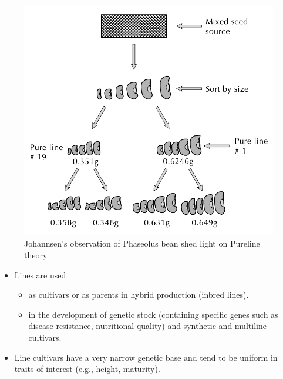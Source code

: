 \documentclass[11pt,dvipsnames,ignorenonframetext,aspectratio=169]{beamer}
\providecommand{\tightlist}{%
  \setlength{\itemsep}{0pt}\setlength{\parskip}{0pt}}
\begin{document}
\begin{frame}{}
\protect\hypertarget{section-7}{}
\begin{figure}

{\centering \includegraphics[width=0.45\linewidth]{../images/johannsens_purlines} 

}

\caption{Johannsen's observation of Phaseolus bean shed light on Pureline theory}\label{fig:johannsens-purelines}
\end{figure}
\end{frame}

\begin{frame}{}
\protect\hypertarget{section-8}{}
\begin{itemize}
\tightlist
\item
  Lines are used

  \begin{itemize}
  \tightlist
  \item
    as cultivars or as parents in hybrid production (inbred lines).
  \item
    in the development of genetic stock (containing specific genes such
    as disease resistance, nutritional quality) and synthetic and
    multiline cultivars.
  \end{itemize}
\item
  Line cultivars have a very narrow genetic base and tend to be uniform
  in traits of interest (e.g., height, maturity).
\end{itemize}
\end{frame}
\end{document}
